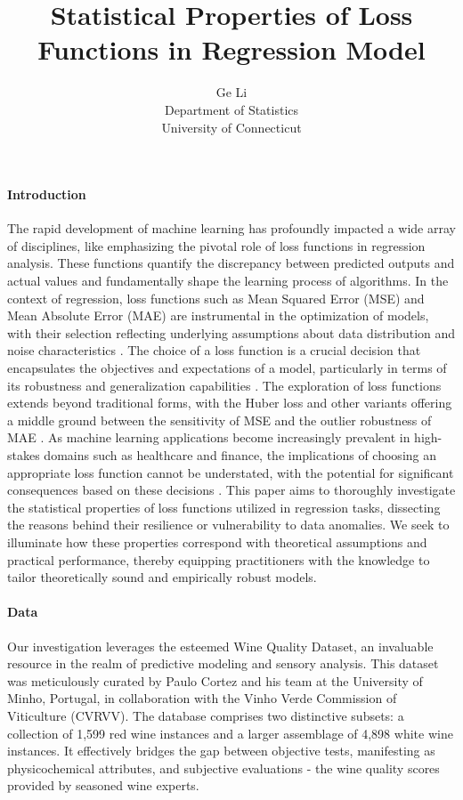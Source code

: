\documentclass[12pt]{article}
\title{Statistical Properties of Loss Functions in Regression Model}
\author{Ge Li\\
  Department of Statistics\\
  University of Connecticut
}
\begin{document}
\maketitle

\paragraph{Introduction}
The rapid development of machine learning has profoundly impacted a wide array of disciplines, like emphasizing the pivotal role of loss functions in regression analysis. These functions quantify the discrepancy between predicted outputs and actual values and fundamentally shape the learning process of algorithms. In the context of regression, loss functions such as Mean Squared Error (MSE) and Mean Absolute Error (MAE) are instrumental in the optimization of models, with their selection reflecting underlying assumptions about data distribution and noise characteristics \cite{hastie2009elements}. The choice of a loss function is a crucial decision that encapsulates the objectives and expectations of a model, particularly in terms of its robustness and generalization capabilities \cite{friedman2001elements}. The exploration of loss functions extends beyond traditional forms, with the Huber loss and other variants offering a middle ground between the sensitivity of MSE and the outlier robustness of MAE \cite{huber2011robust}. As machine learning applications become increasingly prevalent in high-stakes domains such as healthcare and finance, the implications of choosing an appropriate loss function cannot be understated, with the potential for significant consequences based on these decisions \cite{murphy2012machine}. This paper aims to thoroughly investigate the statistical properties of loss functions utilized in regression tasks, dissecting the reasons behind their resilience or vulnerability to data anomalies. We seek to illuminate how these properties correspond with theoretical assumptions and practical performance, thereby equipping practitioners with the knowledge to tailor theoretically sound and empirically robust models.


\paragraph{Data}
Our investigation leverages the esteemed Wine Quality Dataset, an invaluable resource in the realm of predictive modeling and sensory analysis. This dataset was meticulously curated by Paulo Cortez and his team at the University of Minho, Portugal, in collaboration with the Vinho Verde Commission of Viticulture (CVRVV)\citep{cortez_wine_quality}. The database comprises two distinctive subsets: a collection of 1,599 red wine instances and a larger assemblage of 4,898 white wine instances. It effectively bridges the gap between objective tests, manifesting as physicochemical attributes, and subjective evaluations - the wine quality scores provided by seasoned wine experts.
\end{document}
